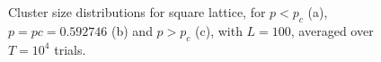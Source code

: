 \documentclass[11pt]{article}
\begin{document}
    \newpage
    \begin{figure}[H]
        \centering
        \bigskip
        \bigskip

        \caption{Cluster size distributions for square lattice, for $p < p_c$ (a), $p = p c = 0.592746$ (b)
            and $p > p_c$ (c), with $L = 100$, averaged over $T = 10^4$ trials.}
        \label{fig:eigth}
    \end{figure}
\end{document}
